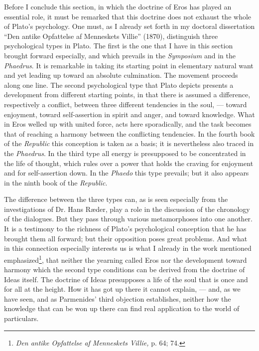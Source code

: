 \documentclass[12pt,a4paper,openany]{book}
\newcommand{\opage}[1]{\marginnote{\footnotesize\textit{[#1]}}}
\begin{document}
Before I conclude this section, in which the doctrine of Eros has
played an essential role, it must be remarked that this
doctrine does not exhaust the whole of Plato's psychology.  One must,
as I already set forth in my doctoral dissertation ``Den antike
Opfattelse af Menneskets Villie'' (1870), distinguish three
psychological types in Plato.  The first is the one that I have in this
section brought forward especially, and which prevails in the \textit{Symposium}
and in the \textit{Phaedrus}.  It is remarkable in taking its starting point
in elementary natural want and yet leading up toward an
absolute culmination.  The movement proceeds along one line.
The second psychological type that Plato depicts presents
a development from different starting points, in that there is assumed
a difference, respectively a conflict, between three different
tendencies in the soul, --- toward enjoyment, toward self-assertion
\setcounter{footnote}{0}%
\opage{53}in spirit and anger, and toward knowledge.  What in Eros welled up
with united force, acts here sporadically, and the task
becomes that of reaching a harmony between the conflicting tendencies.
In the fourth book of the \textit{Republic} this conception is taken as
a basis; it is nevertheless also traced in the \textit{Phaedrus}.  In the third
type all energy is presupposed to be concentrated in the life of thought, which
rules over a power that holds the craving for enjoyment and for self-assertion
down.  In the \textit{Phaedo} this type prevails; but it
also appears in the ninth book of the \textit{Republic}.

The difference between the three types can, as is seen especially
from the investigations of Dr. Hans Ræder, play a role in
the discussion of the chronology of the dialogues.  But they pass through
various metamorphoses into one another.  It is a testimony
to the richness of Plato's psychological conception
that he has brought them all forward; but their opposition
poses great problems.  And what in this connection
especially interests us is what I already in the work mentioned
emphasized\footnote[1]{\textit{Den antike Opfattelse af Menneskets Villie,} p. 64; 74.}, that neither the yearning called
Eros nor the development toward harmony which the second type
conditions can be derived from the doctrine of Ideas itself.  The doctrine of Ideas presupposes
a life of the soul that is once and for all at the height.
How it has got up there it cannot explain, ---
and, as we have seen, and as Parmenides' third objection
establishes, neither how the knowledge that can be
won up there can find real application to the world
of particulars.
\end{document}
